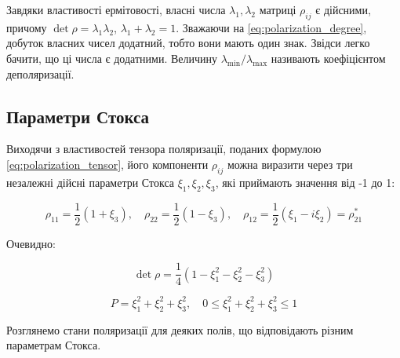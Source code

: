 Завдяки властивості ермітовості, власні числа \(\lambda_1, \lambda_2\) матриці \(\rho_{ij}\) є дійсними, причому \(\det \rho = \lambda_1 \lambda_2\),
\(\lambda_1 + \lambda_2 = 1\). Зважаючи на \eqref{eq:polarization_degree}, добуток власних чисел додатний, тобто вони мають один знак. Звідси легко
бачити, що ці числа є додатними. Величину \(\lambda_{\min}/\lambda_{\max}\) називають коефіцієнтом деполяризації.

\subsection*{Параметри Стокса}

Виходячи з властивостей тензора поляризації, поданих формулою \eqref{eq:polarization_tensor}, його компоненти \(\rho_{ij}\) можна виразити через три
незалежні дійсні параметри Стокса \(\xi_1, \xi_2, \xi_3\), які приймають значення від -1 до 1:

\begin{equation*}
\rho_{11} = \frac{1}{2} \left( 1 + \xi_3 \right), \quad \rho_{22} = \frac{1}{2} \left( 1 - \xi_3 \right), \quad \rho_{12} = \frac{1}{2} \left( \xi_1 -
i\xi_2 \right) = \rho_{21}^{*}
\end{equation*}

Очевидно:

\begin{equation*}
\det \rho = \frac{1}{4} \left( 1 - \xi_1^2 - \xi_2^2 - \xi_3^2 \right)
\end{equation*}

\begin{equation*}
P = \xi_1^2 + \xi_2^2 + \xi_3^2, \quad 0 \leq \xi_1^2 + \xi_2^2 + \xi_3^2 \leq 1
\end{equation*}

Розглянемо стани поляризації для деяких полів, що відповідають різним параметрам Стокса.

